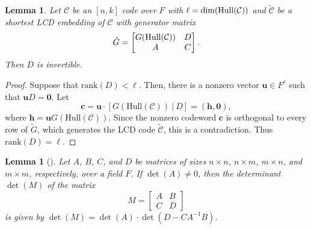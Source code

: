 \documentclass{article}
\newtheorem{lemma}[theorem]{Lemma}
\theoremstyle{definition}
\theoremstyle{remark}
\begin{document}
\begin{lemma}\label{D-inv}
    Let $\mathcal{C}$ be an $[n, k]$ code over $F$ with $\ell=\dim({\rm Hull}(\mathcal{C}))$ and $\tilde{\mathcal{C}}$ be a shortest LCD embedding of $\mathcal{C}$ with generator matrix
    \[
    \tilde{G}=\begin{bmatrix}
        G({\rm Hull}(\mathcal{C})) & D\\A & C
    \end{bmatrix}.
    \]
    Then $D$ is invertible.
\end{lemma}
\begin{proof}
    Suppose that $\text{rank}(D)< \ell$. Then, there is a nonzero vector $\mathbf{u}\in F^\ell$ such that $\mathbf{u}D=\mathbf{0}$. Let
    \[
    \mathbf{c}=\mathbf{u}\cdot[G(\text{Hull}(\mathcal{C}))~|~D]=(\mathbf{h}, \mathbf{0}),
    \]
    where $\mathbf{h}=\mathbf{u}G(\text{Hull}(\mathcal{C}))$. Since the nonzero codeword $\mathbf{c}$ is orthogonal to every row of $\tilde{G}$, which generates the LCD code $\tilde{\mathcal{C}}$, this is a contradiction. Thus $\text{rank}(D)=\ell$.
\end{proof}

\begin{lemma}[\cite{Zhang-Schur}]\label{Schur_lemma}
Let $A$, $B$, $C$, and $D$ be matrices of sizes $n\times n$, $n\times m$, $m\times n$, and $m\times m$, respectively, over a field $F$. If $\det(A)\ne 0$, then the determinant $\det(M)$ of the matrix
\[
M=\begin{bmatrix}
    A & B\\C & D
\end{bmatrix}
\]
is given by $\det (M)=\det (A)\cdot \det(D-CA^{-1}B)$.
\end{lemma}
\end{document}
